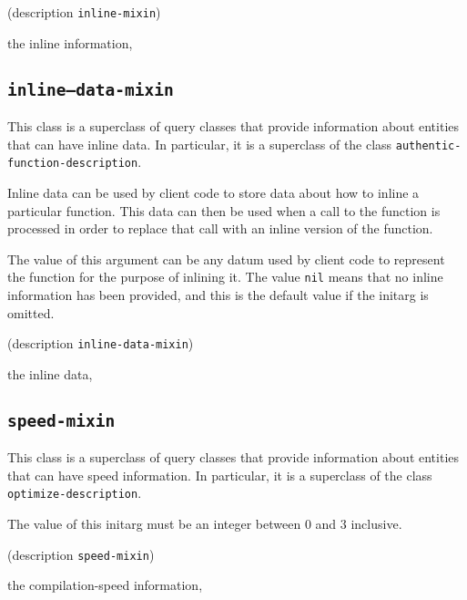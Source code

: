 {\footnotesize
{} {(description {\tt inline-mixin})}
}

 the inline information, 

\subsection{\texttt{inline--data-mixin}}
\label{sec-inline-data-mixin}

{\footnotesize
{}
}

This class is a superclass of query classes that provide information
about entities that can have inline data.  In particular, it is a
superclass of the class \texttt{authentic-function-description}.

Inline data can be used by client code to store data about how to
inline a particular function.  This data can then be used when a call
to the function is processed in order to replace that call with an
inline version of the function.

{\footnotesize
{}
}

The value of this argument can be any datum used by client code to
represent the function for the purpose of inlining it.  The value
\texttt{nil} means that no inline information has been provided, and
this is the default value if the initarg is omitted.

{\footnotesize
{} {(description {\tt inline-data-mixin})}
}

 the inline data, 

\subsection{\texttt{speed-mixin}}
\label{sec-speed-mixin}

{\footnotesize
{}
}

This class is a superclass of query classes that provide information
about entities that can have speed information.  In particular, it is a
superclass of the class \texttt{optimize-description}.

{\footnotesize
{}
}

The value of this initarg must be an integer between $0$ and $3$
inclusive.

{\footnotesize
{} {(description {\tt speed-mixin})}
}

 the compilation-speed information, 

